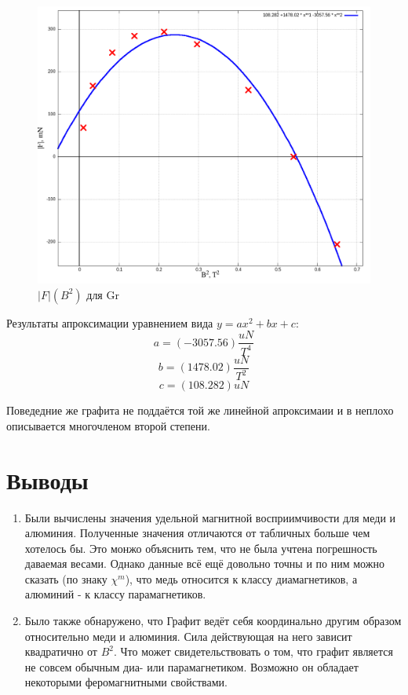 \documentclass{article}
\begin{document}
    
    \begin{figure}[H]
        \centering
        \includegraphics[width=\textwidth]{Gr-comp.png}
        \caption{$|F|(B^2)$ для Gr}
    \end{figure}

    Результаты апроксимации уравнением вида \(y = ax^2 + bx + c\):
    \[ a = (-3057.56) \frac{uN}{T^4} \]
    \[ b = (1478.02) \frac{uN}{T^2} \]
    \[ c = (108.282) uN \]

    Поведедние же графита не поддаётся той же линейной апроксимаии и в неплохо описывается многочленом второй степени.

    \section {Выводы}
    \begin{enumerate}
        \item Были вычислены значения удельной магнитной восприимчивости для меди и алюминия. Полученные
    значения отличаются от табличных больше чем хотелось бы. Это монжо объяснить тем, что не была учтена погрешность
    даваемая весами. Однако данные всё ещё довольно точны и по ним можно сказать (по знаку $\chi^m$), что медь
    относится к классу диамагнетиков, а алюминий - к классу парамагнетиков.
        \item Было также обнаружено, что Графит ведёт себя координально другим образом относительно меди
    и алюминия. Сила действующая на него зависит квадратично от \(B^2\). Что может свидетельствовать о том,
    что графит является не совсем обычным диа- или парамагнетиком. Возможно он обладает некоторыми феромагнитными
    свойствами.

    \end{enumerate}
\end{document}
